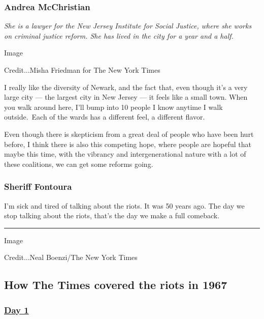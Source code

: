 \hypertarget{andrea-mcchristian}{%
\subsubsection{Andrea McChristian}\label{andrea-mcchristian}}

\emph{She is a lawyer for the New Jersey Institute for Social Justice,
where she works on criminal justice reform. She has lived in the city
for a year and a half.}

Image

Credit...Misha Friedman for The New York Times

I really like the diversity of Newark, and the fact that, even though
it's a very large city --- the largest city in New Jersey --- it feels
like a small town. When you walk around here, I'll bump into 10 people I
know anytime I walk outside.~Each of the wards has a different feel, a
different flavor.

Even though there is skepticism from a great deal of people who have
been hurt before, I think there is also this competing hope, where
people are hopeful that maybe this time, with the vibrancy and
intergenerational nature with a lot of these coalitions, we can get some
reforms going. ​

\hypertarget{sheriff-fontoura-1}{%
\subsubsection{Sheriff Fontoura}\label{sheriff-fontoura-1}}

I'm sick and tired of talking about the riots. It was 50 years ago. The
day we stop talking about the riots, that's the day we make a full
comeback.~

\begin{center}\rule{0.5\linewidth}{\linethickness}\end{center}

Image

Credit...Neal Boenzi/The New York Times

\hypertarget{how-the-times-covered-the-riots-in-1967}{%
\subsection{How The Times covered the riots in
1967}\label{how-the-times-covered-the-riots-in-1967}}

\hypertarget{day-1}{%
\subsubsection{\texorpdfstring{\href{https://timesmachine.nytimes.com/timesmachine/1967/07/13/90372463.html?pageNumber=1}{Day
1}}{Day 1}}\label{day-1}}

